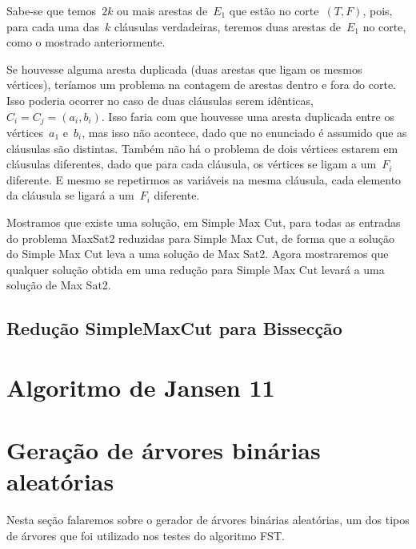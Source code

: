 \documentclass[a4paper,12pt]{article}
\begin{document}
		Sabe-se que temos~$2k$ ou mais arestas de~$E_1$ que estão no
		corte~$(T,F)$, pois, para cada uma das~$k$ cláusulas
		verdadeiras, teremos duas arestas de~$E_1$ no corte, como
		o mostrado anteriormente.

		Se houvesse alguma aresta duplicada (duas arestas que ligam
		os mesmos vértices), teríamos um problema na contagem de
		arestas dentro e fora do corte.
		Isso poderia ocorrer no caso de duas cláusulas serem 
		idênticas,~$C_i=C_j=(a_i,b_i)$.
		Isso faria com que houvesse uma aresta duplicada entre
		os vértices~$a_1$ e~$b_i$, mas isso não acontece, dado que
		no enunciado é assumido que as cláusulas são distintas.
		Também não há o problema de dois vértices estarem em cláusulas
		diferentes, dado que para cada cláusula, os vértices se ligam
		a um~$F_i$ diferente.
		E mesmo se repetirmos as variáveis na mesma cláusula, cada
		elemento da cláusula se ligará a um~$F_i$ diferente.

		\bigskip

		Mostramos que existe uma solução, em Simple Max Cut, 
		para todas as entradas do
		problema MaxSat2 reduzidas para Simple Max Cut, de forma que
		a solução do Simple Max Cut leva a uma solução de Max Sat2.
		Agora mostraremos que qualquer solução obtida em 
		uma redução para Simple Max Cut levará a uma solução de Max Sat2.

	\subsection{Redução SimpleMaxCut para Bissecção}



\section {Algoritmo de Jansen 11}



\newpage

\section {Geração de árvores binárias aleatórias}
	Nesta seção falaremos sobre o gerador de árvores binárias 
	aleatórias, um dos tipos de árvores que foi utilizado nos 
	testes do algoritmo FST.
\end{document}
